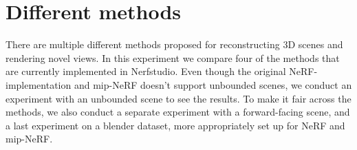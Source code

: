 \section{Different methods}
There are multiple different methods proposed for reconstructing 3D scenes and rendering novel views. In this experiment we compare four of the methods that are currently implemented in Nerfstudio. Even though the original NeRF-implementation and mip-NeRF doesn't support unbounded scenes, we conduct an experiment with an unbounded scene to see the results. To make it fair across the methods, we also conduct a separate experiment with a forward-facing scene, and a last experiment on a blender dataset, more appropriately set up for NeRF and mip-NeRF.

